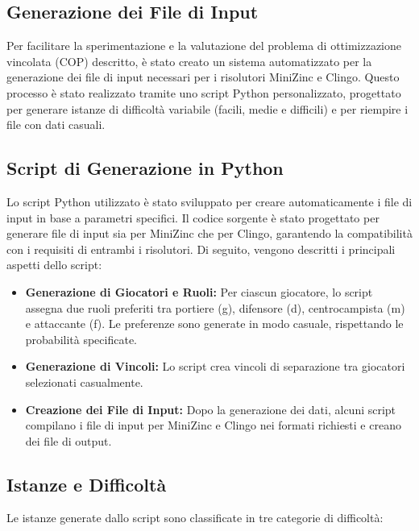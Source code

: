 \documentclass{article}
\begin{document}
\begin{multicols*}{2}
\section{Generazione dei File di Input}

Per facilitare la sperimentazione e la valutazione del problema di ottimizzazione vincolata (COP) descritto, è stato creato un sistema automatizzato per la generazione dei file di input necessari per i risolutori MiniZinc e Clingo. Questo processo è stato realizzato tramite uno script Python personalizzato, progettato per generare istanze di difficoltà variabile (facili, medie e difficili) e per riempire i file con dati casuali.

\subsection{Script di Generazione in Python}

Lo script Python utilizzato è stato sviluppato per creare automaticamente i file di input in base a parametri specifici. Il codice sorgente è stato progettato per generare file di input sia per MiniZinc che per Clingo, garantendo la compatibilità con i requisiti di entrambi i risolutori. Di seguito, vengono descritti i principali aspetti dello script:

\begin{itemize}
    \item \textbf{Generazione di Giocatori e Ruoli:} Per ciascun giocatore, lo script assegna due ruoli preferiti tra portiere (g), difensore (d), centrocampista (m) e attaccante (f). Le preferenze sono generate in modo casuale, rispettando le probabilità specificate.
    \item \textbf{Generazione di Vincoli:} Lo script crea vincoli di separazione tra giocatori selezionati casualmente.
    \item \textbf{Creazione dei File di Input:} Dopo la generazione dei dati, alcuni script compilano i file di input per MiniZinc e Clingo nei formati richiesti e creano dei file di output.
\end{itemize}

\subsection{Istanze e Difficoltà}

Le istanze generate dallo script sono classificate in tre categorie di difficoltà:


\end{multicols*}
\end{document}
